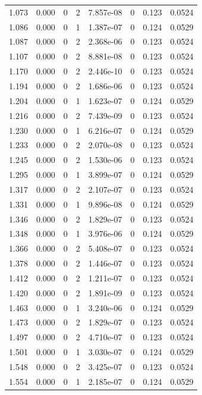 \documentclass[preview]{standalone}
\begin{document}
{{{\begin{tabular}{L{1.2cm}C{1.2cm} C{0.3cm}C{0.5cm} C{1.4cm}C{1.4cm} C{1.4cm}C{1.4cm}}
  1.073  &  0.000  & 0     &  2 &  7.857e-08  & 0  & 0.123 &  0.0524   \\ 
  1.086  &  0.000  & 0     &  1 &  1.387e-07  & 0  & 0.124 &  0.0529   \\ 
  1.087  &  0.000  & 0     &  2 &  2.368e-06  & 0  & 0.123 &  0.0524   \\ 
  1.107  &  0.000  & 0     &  2 &  8.881e-08  & 0  & 0.123 &  0.0524   \\ 
  1.170  &  0.000  & 0     &  2 &  2.446e-10  & 0  & 0.123 &  0.0524   \\ 
  1.194  &  0.000  & 0     &  2 &  1.686e-06  & 0  & 0.123 &  0.0524   \\ 
  1.204  &  0.000  & 0     &  1 &  1.623e-07  & 0  & 0.124 &  0.0529   \\ 
  1.216  &  0.000  & 0     &  2 &  7.439e-09  & 0  & 0.123 &  0.0524   \\ 
  1.230  &  0.000  & 0     &  1 &  6.216e-07  & 0  & 0.124 &  0.0529   \\ 
  1.233  &  0.000  & 0     &  2 &  2.070e-08  & 0  & 0.123 &  0.0524   \\ 
  1.245  &  0.000  & 0     &  2 &  1.530e-06  & 0  & 0.123 &  0.0524   \\ 
  1.295  &  0.000  & 0     &  1 &  3.899e-07  & 0  & 0.124 &  0.0529   \\ 
  1.317  &  0.000  & 0     &  2 &  2.107e-07  & 0  & 0.123 &  0.0524   \\ 
  1.331  &  0.000  & 0     &  1 &  9.896e-08  & 0  & 0.124 &  0.0529   \\ 
  1.346  &  0.000  & 0     &  2 &  1.829e-07  & 0  & 0.123 &  0.0524   \\ 
  1.348  &  0.000  & 0     &  1 &  3.976e-06  & 0  & 0.124 &  0.0529   \\ 
  1.366  &  0.000  & 0     &  2 &  5.408e-07  & 0  & 0.123 &  0.0524   \\ 
  1.378  &  0.000  & 0     &  2 &  1.446e-07  & 0  & 0.123 &  0.0524   \\ 
  1.412  &  0.000  & 0     &  2 &  1.211e-07  & 0  & 0.123 &  0.0524   \\ 
  1.420  &  0.000  & 0     &  2 &  1.891e-09  & 0  & 0.123 &  0.0524   \\ 
  1.463  &  0.000  & 0     &  1 &  3.240e-06  & 0  & 0.124 &  0.0529   \\ 
  1.473  &  0.000  & 0     &  2 &  1.829e-07  & 0  & 0.123 &  0.0524   \\ 
  1.497  &  0.000  & 0     &  2 &  4.710e-07  & 0  & 0.123 &  0.0524   \\ 
  1.501  &  0.000  & 0     &  1 &  3.030e-07  & 0  & 0.124 &  0.0529   \\ 
  1.548  &  0.000  & 0     &  2 &  3.425e-07  & 0  & 0.123 &  0.0524   \\ 
  1.554  &  0.000  & 0     &  1 &  2.185e-07  & 0  & 0.124 &  0.0529   \\ 
\hline 
\end{tabular} 

}}}
\end{document}
